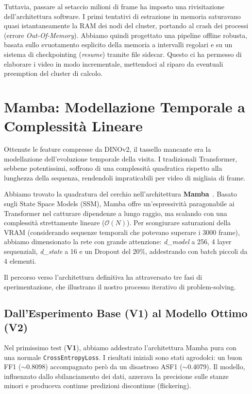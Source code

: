 \documentclass[a4paper,12pt]{report}
\begin{document}
Tuttavia, passare al setaccio milioni di frame ha imposto una rivisitazione dell'architettura software. I primi tentativi di estrazione in memoria saturavano quasi istantaneamente la RAM dei nodi del cluster, portando al crash dei processi (errore \emph{Out-Of-Memory}). Abbiamo quindi progettato una pipeline offline robusta, basata sullo svuotamento esplicito della memoria a intervalli regolari e su un sistema di checkpointing (\emph{resume}) tramite file sidecar. Questo ci ha permesso di elaborare i video in modo incrementale, mettendoci al riparo da eventuali preemption del cluster di calcolo.

\section{Mamba: Modellazione Temporale a Complessità Lineare}
Ottenute le feature compresse da DINOv2, il tassello mancante era la modellazione dell'evoluzione temporale della visita. I tradizionali Transformer, sebbene potentissimi, soffrono di una complessità quadratica rispetto alla lunghezza della sequenza, rendendoli impraticabili per video di migliaia di frame.

Abbiamo trovato la quadratura del cerchio nell'architettura \textbf{Mamba}~\cite{mamba}. Basato sugli State Space Models (SSM), Mamba offre un'espressività paragonabile ai Transformer nel catturare dipendenze a lungo raggio, ma scalando con una complessità strettamente lineare ($\mathcal{O}(N)$). Per scongiurare saturazioni della VRAM (considerando sequenze temporali che potevano superare i 3000 frame), abbiamo dimensionato la rete con grande attenzione: \emph{d\_model} a 256, 4 layer sequenziali, \emph{d\_state} a 16 e un Dropout del 20\%, addestrando con batch piccoli da 4 elementi.

Il percorso verso l'architettura definitiva ha attraversato tre fasi di sperimentazione, che illustrano il nostro processo iterativo di problem-solving.

\subsection{Dall'Esperimento Base (V1) al Modello Ottimo (V2)}
Nel primissimo test (\textbf{V1}), abbiamo addestrato l'architettura Mamba pura con una normale \texttt{CrossEntropyLoss}. I risultati iniziali sono stati agrodolci: un buon FF1 ($\sim$0.8098) accompagnato però da un disastroso ASF1 ($\sim$0.4079). Il modello, influenzato dallo sbilanciamento dei dati, azzerava la precisione sulle stanze minori e produceva continue predizioni discontinue (flickering).
\end{document}
